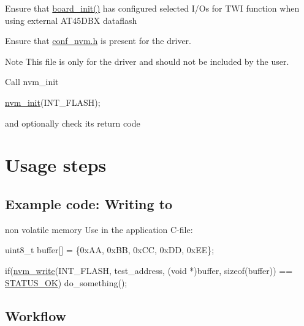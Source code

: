 \begin{DoxyEnumerate}
\item Ensure that \hyperlink{group__group__common__boards_ga916f2adc2080b4fe88034086d107a8dc}{board\-\_\-init()} has configured selected I/\-Os for T\-W\-I function when using external A\-T45\-D\-B\-X dataflash
\item Ensure that \hyperlink{conf__nvm_8h}{conf\-\_\-nvm.\-h} is present for the driver.
\begin{DoxyItemize}
\item \begin{DoxyNote}{Note}
This file is only for the driver and should not be included by the user.
\end{DoxyNote}

\end{DoxyItemize}
\item Call nvm\-\_\-init 
\begin{DoxyCode}
 \hyperlink{xmega__nvm_8c_a0ac16f4de49f2f0df16e3cf56be5f578}{nvm\_init}(INT\_FLASH); 
\end{DoxyCode}
 and optionally check its return code
\end{DoxyEnumerate}\hypertarget{common_nvm_quickstart_nvm_basic_use_case_usage}{}\section{Usage steps}\label{common_nvm_quickstart_nvm_basic_use_case_usage}
\hypertarget{common_nvm_quickstart_nvm_basic_use_case_usage_code_writing}{}\subsection{Example code\-: Writing to}\label{common_nvm_quickstart_nvm_basic_use_case_usage_code_writing}
non volatile memory Use in the application C-\/file\-: 
\begin{DoxyCode}
           uint8\_t buffer[] = \{0xAA, 0xBB, 0xCC, 0xDD, 0xEE\};

           \textcolor{keywordflow}{if}(\hyperlink{xmega__nvm_8c_ae2475c24bb003e7e1368d2c488d22db3}{nvm\_write}(INT\_FLASH, test\_address, (\textcolor{keywordtype}{void} *)buffer, \textcolor{keyword}{
      sizeof}(buffer)) ==
         \hyperlink{group__group__xmega__utils__status__codes_gga751c892e5a46b8e7d282085a5a5bf151a7e4a42e3b6dd63708c64cf3db6f69566}{STATUS\_OK})
             do\_something();
\end{DoxyCode}
\hypertarget{common_nvm_quickstart_nvm_basic_use_case_usage_flow}{}\subsection{Workflow}\label{common_nvm_quickstart_nvm_basic_use_case_usage_flow}

